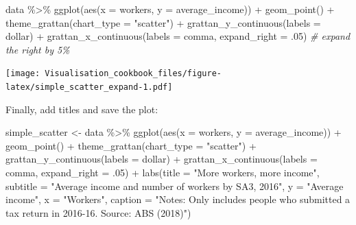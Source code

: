 \documentclass[
]{book}
\newenvironment{Shaded}{\begin{snugshade}}{\end{snugshade}}
\newcommand{\AttributeTok}[1]{\textcolor[rgb]{0.77,0.63,0.00}{#1}}
\newcommand{\CommentTok}[1]{\textcolor[rgb]{0.56,0.35,0.01}{\textit{#1}}}
\newcommand{\DecValTok}[1]{\textcolor[rgb]{0.00,0.00,0.81}{#1}}
\newcommand{\FunctionTok}[1]{\textcolor[rgb]{0.00,0.00,0.00}{#1}}
\newcommand{\NormalTok}[1]{#1}
\newcommand{\OtherTok}[1]{\textcolor[rgb]{0.56,0.35,0.01}{#1}}
\newcommand{\SpecialCharTok}[1]{\textcolor[rgb]{0.00,0.00,0.00}{#1}}
\newcommand{\StringTok}[1]{\textcolor[rgb]{0.31,0.60,0.02}{#1}}
\begin{document}
\begin{Shaded}
\begin{Highlighting}[]
\NormalTok{data }\SpecialCharTok{\%\textgreater{}\%} 
  \FunctionTok{ggplot}\NormalTok{(}\FunctionTok{aes}\NormalTok{(}\AttributeTok{x =}\NormalTok{ workers,}
             \AttributeTok{y =}\NormalTok{ average\_income)) }\SpecialCharTok{+} 
  \FunctionTok{geom\_point}\NormalTok{()  }\SpecialCharTok{+}
  \FunctionTok{theme\_grattan}\NormalTok{(}\AttributeTok{chart\_type =} \StringTok{"scatter"}\NormalTok{) }\SpecialCharTok{+} 
  \FunctionTok{grattan\_y\_continuous}\NormalTok{(}\AttributeTok{labels =}\NormalTok{ dollar) }\SpecialCharTok{+} 
  \FunctionTok{grattan\_x\_continuous}\NormalTok{(}\AttributeTok{labels =}\NormalTok{ comma,}
                       \AttributeTok{expand\_right =}\NormalTok{ .}\DecValTok{05}\NormalTok{) }\CommentTok{\# expand the right by 5\%}
\end{Highlighting}
\end{Shaded}

\texttt{[image: Visualisation\_cookbook\_files/figure-latex/simple\_scatter\_expand-1.pdf]}

Finally, add titles and save the plot:

\begin{Shaded}
\begin{Highlighting}[]
\NormalTok{simple\_scatter }\OtherTok{\textless{}{-}}\NormalTok{ data }\SpecialCharTok{\%\textgreater{}\%} 
  \FunctionTok{ggplot}\NormalTok{(}\FunctionTok{aes}\NormalTok{(}\AttributeTok{x =}\NormalTok{ workers,}
             \AttributeTok{y =}\NormalTok{ average\_income)) }\SpecialCharTok{+} 
  \FunctionTok{geom\_point}\NormalTok{()  }\SpecialCharTok{+}
  \FunctionTok{theme\_grattan}\NormalTok{(}\AttributeTok{chart\_type =} \StringTok{"scatter"}\NormalTok{) }\SpecialCharTok{+} 
  \FunctionTok{grattan\_y\_continuous}\NormalTok{(}\AttributeTok{labels =}\NormalTok{ dollar) }\SpecialCharTok{+} 
  \FunctionTok{grattan\_x\_continuous}\NormalTok{(}\AttributeTok{labels =}\NormalTok{ comma,}
                       \AttributeTok{expand\_right =}\NormalTok{ .}\DecValTok{05}\NormalTok{) }\SpecialCharTok{+} 
  \FunctionTok{labs}\NormalTok{(}\AttributeTok{title =} \StringTok{"More workers, more income"}\NormalTok{,}
       \AttributeTok{subtitle =} \StringTok{"Average income and number of workers by SA3, 2016"}\NormalTok{,}
       \AttributeTok{y =} \StringTok{"Average income"}\NormalTok{,}
       \AttributeTok{x =} \StringTok{"Workers"}\NormalTok{,}
       \AttributeTok{caption =} \StringTok{"Notes: Only includes people who submitted a tax return in 2016{-}16. Source: ABS (2018)"}\NormalTok{)}
\end{Highlighting}
\end{Shaded}
\end{document}
